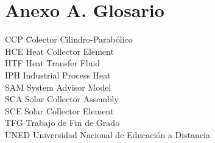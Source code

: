 \documentclass[12pt]{report} %
\begin{document}

\chapter* {Anexo A. Glosario}

\begin{tabbing}	
CCP \quad\= Colector Cilindro-Parabólico  \\
HCE \> Heat Collector Element \\
HTF \> Heat Transfer Fluid \\
IPH \> Industrial Process Heat \\
SAM\> System Advisor Model \\
SCA \> Solar Collector Assembly\\
SCE \> Solar Collector Element \\
TFG	\>Trabajo de Fin de Grado \\
UNED \> Universidad Nacional de Educación a Distancia \\
\end{tabbing}
\end{document}

